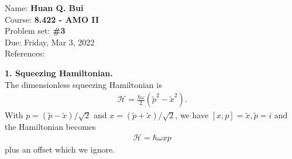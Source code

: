 \documentclass{article}
\theoremstyle{definition}
\newcommand{\ham}{\mathcal{H}}
\newcommand{\f}[2]{\frac{#1}{#2}}
\begin{document}
\begin{framed}
\noindent Name: \textbf{Huan Q. Bui}\\
Course: \textbf{8.422 - AMO II}\\
Problem set: \textbf{\#3}\\
Due: Friday, Mar 3, 2022\\
References: 
\end{framed}
	
	
\noindent \textbf{1. Squeezing Hamiltonian.} \\

\noindent The dimensionless squeezing Hamiltonian is 
\begin{align*}
\ham = \f{\hbar \omega}{2} (\tilde{p}^2 - \tilde{x}^2). 
\end{align*}
With $p = (\tilde{p}- \tilde{x}) / \sqrt{2}$ and $x = (\tilde{p} + \tilde{x})/\sqrt{2}$, we have $[x,p] = \tilde{x}, \tilde{p} = i$ and the Hamiltonian becomes
\begin{align*}
\ham = \hbar \omega xp
\end{align*}
plus an offset which we ignore. 
\end{document}
